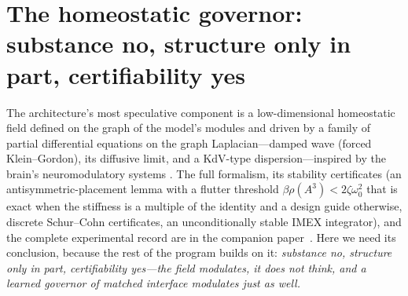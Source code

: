 \documentclass{article}
\newcommand{\compcite}{\citep{anon2026governor}}
\newcommand{\compcite}{\citep{arrabal2026governor}}
\begin{document}
\section{The homeostatic governor: substance no, structure only in part,
certifiability yes}
\label{sec:gobernar}

The architecture's most speculative component is a low-dimensional
homeostatic field defined on the graph of the model's modules and driven by a
family of partial differential equations on the graph Laplacian---damped wave
(forced Klein--Gordon), its diffusive limit, and a KdV-type
dispersion---inspired by the brain's neuromodulatory systems
\citep{barrett2017allostasis,man2022homeostatic,vecoven2020neuromodulation}.
The full formalism, its stability certificates (an antisymmetric-placement
lemma with a flutter threshold $\beta\rho(A^3)<2\zeta\omega_0^2$ that is exact
when the stiffness is a multiple of the identity and a design guide otherwise,
discrete Schur--Cohn certificates, an unconditionally stable IMEX
integrator), and the complete experimental record are in the companion
paper~\compcite{}. Here we need its conclusion, because the
rest of the program builds on it: \emph{substance no, structure only in
part, certifiability yes---the field modulates, it does not think, and a
learned governor of matched interface modulates just as well.}
\end{document}

